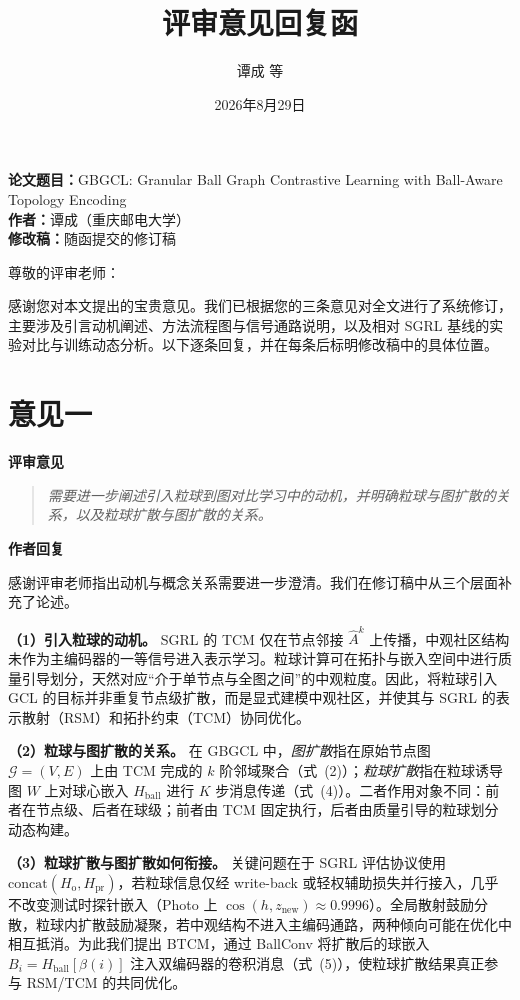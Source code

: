 \documentclass[11pt,a4paper]{ctexart}
\title{评审意见回复函}
\author{谭成 等}
\date{2026年8月29日}
\newcommand{\RC}[1]{%
  \par\vspace{0.6em}\noindent\textbf{评审意见}\par
  \begin{quote}\itshape #1\end{quote}}
\newcommand{\AR}[1]{%
  \par\vspace{0.4em}\noindent\textbf{作者回复}\par
  #1\par}
\begin{document}
\maketitle

\noindent\textbf{论文题目：}GBGCL: Granular Ball Graph Contrastive Learning with Ball-Aware Topology Encoding\\
\textbf{作者：}谭成（重庆邮电大学）\\
\textbf{修改稿：}随函提交的修订稿

\vspace{1em}
\noindent 尊敬的评审老师：

感谢您对本文提出的宝贵意见。我们已根据您的三条意见对全文进行了系统修订，主要涉及引言动机阐述、方法流程图与信号通路说明，以及相对 SGRL 基线的实验对比与训练动态分析。以下逐条回复，并在每条后标明修改稿中的具体位置。

\section*{意见一}

\RC{需要进一步阐述引入粒球到图对比学习中的动机，并明确粒球与图扩散的关系，以及粒球扩散与图扩散的关系。}

\AR{感谢评审老师指出动机与概念关系需要进一步澄清。我们在修订稿中从三个层面补充了论述。

\textbf{（1）引入粒球的动机。}
SGRL 的 TCM 仅在节点邻接 $\hat{A}^{k}$ 上传播，中观社区结构未作为主编码器的一等信号进入表示学习。粒球计算可在拓扑与嵌入空间中进行质量引导划分，天然对应``介于单节点与全图之间''的中观粒度。因此，将粒球引入 GCL 的目标并非重复节点级扩散，而是显式建模中观社区，并使其与 SGRL 的表示散射（RSM）和拓扑约束（TCM）协同优化。

\textbf{（2）粒球与图扩散的关系。}
在 GBGCL 中，\emph{图扩散}指在原始节点图 $\mathcal{G}=(V,E)$ 上由 TCM 完成的 $k$ 阶邻域聚合（式~(2)）；\emph{粒球扩散}指在粒球诱导图 $W$ 上对球心嵌入 $H_{\mathrm{ball}}$ 进行 $K$ 步消息传递（式~(4)）。二者作用对象不同：前者在节点级、后者在球级；前者由 TCM 固定执行，后者由质量引导的粒球划分动态构建。

\textbf{（3）粒球扩散与图扩散如何衔接。}
关键问题在于 SGRL 评估协议使用 $\mathrm{concat}(H_{\mathrm{o}}, H_{\mathrm{pr}})$，若粒球信息仅经 write-back 或轻权辅助损失并行接入，几乎不改变测试时探针嵌入（Photo 上 $\cos(h,z_{\mathrm{new}})\approx 0.9996$）。全局散射鼓励分散，粒球内扩散鼓励凝聚，若中观结构不进入主编码通路，两种倾向可能在优化中相互抵消。为此我们提出 BTCM，通过 BallConv 将扩散后的球嵌入 $B_i=H_{\mathrm{ball}}[\beta(i)]$ 注入双编码器的卷积消息（式~(5)），使粒球扩散结果真正参与 RSM/TCM 的共同优化。}
\end{document}
